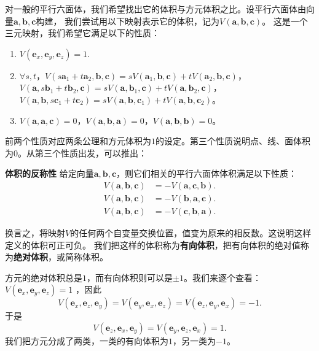 \documentclass[12pt,UTF8]{ctexbook}
\begin{document}
对一般的平行六面体，我们希望找出它的体积与方元体积之比。设平行六面体由向量$\mathbf{a},\mathbf{b},\mathbf{c}$构建，
我们尝试用以下映射表示它的体积，记为$V(\mathbf{a},\mathbf{b},\mathbf{c})$。
这是一个三元映射，我们希望它满足以下的性质：
\begin{enumerate}
    \item $V(\mathbf{e}_x, \mathbf{e}_y, \mathbf{e}_z) = 1.$ 
    \item $\forall s,t$，$V(s\mathbf{a}_1+t\mathbf{a}_2,\mathbf{b},\mathbf{c}) = sV(\mathbf{a}_1,\mathbf{b},\mathbf{c})+tV(\mathbf{a}_2,\mathbf{b},\mathbf{c})$，$V(\mathbf{a},s\mathbf{b}_1+t\mathbf{b}_2,\mathbf{c}) = sV(\mathbf{a},\mathbf{b}_1,\mathbf{c})+tV(\mathbf{a},\mathbf{b}_2,\mathbf{c})$，$V(\mathbf{a},\mathbf{b},s\mathbf{c}_1+t\mathbf{c}_2) = sV(\mathbf{a},\mathbf{b},\mathbf{c}_1)+tV(\mathbf{a},\mathbf{b},\mathbf{c}_2)$。
    \item $V(\mathbf{a},\mathbf{a},\mathbf{c}) = 0$，$V(\mathbf{a},\mathbf{b},\mathbf{a})=0$，$V(\mathbf{a},\mathbf{b},\mathbf{b})=0$。
\end{enumerate}
前两个性质对应两条公理和方元体积为$1$的设定。第三个性质说明点、线、面体积为$0$。从第三个性质出发，可以推出：
\begin{tm}{\textbf{体积的反称性}}\label{tm:3-0-0}
    给定向量$\mathbf{a},\mathbf{b},\mathbf{c}$，则它们相关的平行六面体体积满足以下性质：
    \begin{align*}
        V(\mathbf{a},\mathbf{b},\mathbf{c}) &= -V(\mathbf{a},\mathbf{c},\mathbf{b}).  \\
        V(\mathbf{a},\mathbf{b},\mathbf{c}) &= -V(\mathbf{b},\mathbf{a},\mathbf{c}).  \\
        V(\mathbf{a},\mathbf{b},\mathbf{c}) &= -V(\mathbf{c},\mathbf{b},\mathbf{a}).  
    \end{align*}
\end{tm}
换言之，将映射$V$的任何两个自变量交换位置，值变为原来的相反数。这说明这样定义的体积可正可负。
我们把这样的体积称为\textbf{有向体积}，把有向体积的绝对值称为\textbf{绝对体积}，或简称体积。

方元的绝对体积总是$1$，而有向体积则可以是$\pm 1$。我们来逐个查看：
$V(\mathbf{e}_x, \mathbf{e}_y, \mathbf{e}_z) = 1$ ，因此
$$ V(\mathbf{e}_x, \mathbf{e}_z, \mathbf{e}_y) = V(\mathbf{e}_y, \mathbf{e}_x, \mathbf{e}_z)  = V(\mathbf{e}_z, \mathbf{e}_y, \mathbf{e}_x)  = -1.$$
于是
$$ V(\mathbf{e}_z, \mathbf{e}_x, \mathbf{e}_y) = V(\mathbf{e}_y, \mathbf{e}_z, \mathbf{e}_x)   = 1.$$
我们把方元分成了两类，一类的有向体积为$1$，另一类为$-1$。
\end{document}
